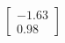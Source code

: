 \documentclass[preview]{standalone}
\begin{document}
\begin{align*}
\begin{bmatrix} -1.63 \\ 0.98 \end{bmatrix}
\end{align*}
\end{document}
